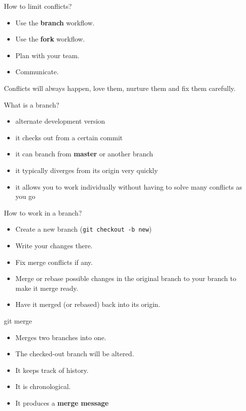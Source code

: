 \documentclass[14pt]{beamer}
\begin{document}
	\begin{frame}{How to limit conflicts?}
	\begin{itemize}
		\item Use the \textbf{branch} workflow.
		\item Use the \textbf{fork} workflow.
		\item Plan with your team.
		\item Communicate.
	\end{itemize}

	\vspace{5pt}

	Conflicts will always happen, love them, nurture them and fix them carefully.
\end{frame}

	\begin{frame}{What is a branch?}
	\begin{itemize}
		\item alternate development version
		\item it checks out from a certain commit
		\item it can branch from \textbf{master} or another branch
		\item it typically diverges from its origin very quickly
		\item it allows you to work individually without having to solve many conflicts as you go
	\end{itemize}
\end{frame}

	\begin{frame}{How to work in a branch?}
	\begin{itemize}
		\item Create a new branch (\texttt{git checkout -b new})
		\item Write your changes there.
		\item Fix merge conflicts if any.
		\item Merge or rebase possible changes in the original branch to your branch to make it merge ready.
		\item Have it merged (or rebased) back into its origin.
	\end{itemize}
\end{frame}

	\begin{frame}{git merge}
	\begin{itemize}
		\item Merges two branches into one.
		\item The checked-out branch will be altered.
		\item It keeps track of history.
		\item It is chronological.
		\item It produces a \textbf{merge message}
	\end{itemize}
\end{frame}
\end{document}
